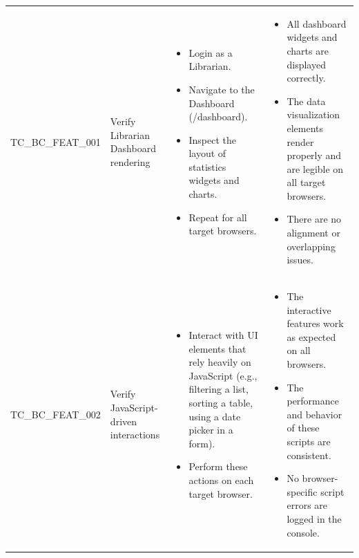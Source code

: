 \begin{longtable}{|>{\scriptsize\raggedright\arraybackslash}p{3cm}|>{\raggedright\arraybackslash}p{3.5cm}|>{\raggedright\arraybackslash}p{4cm}|>{\raggedright\arraybackslash}p{5cm}|}
\multicolumn{4}{|l|}{\textbf{Sub-Section: Feature-Specific Checks}} \\ \hline
TC\_BC\_FEAT\_001 & Verify Librarian Dashboard rendering & 
    \begin{itemize}[noitemsep, topsep=0pt, partopsep=0pt, leftmargin=*]
        \item Login as a Librarian.
        \item Navigate to the Dashboard (/dashboard).
        \item Inspect the layout of statistics widgets and charts.
        \item Repeat for all target browsers.
    \end{itemize} & 
    \begin{itemize}[noitemsep, topsep=0pt, partopsep=0pt, leftmargin=*]
        \item All dashboard widgets and charts are displayed correctly.
        \item The data visualization elements render properly and are legible on all target browsers.
        \item There are no alignment or overlapping issues.
    \end{itemize} \\ \hline
TC\_BC\_FEAT\_002 & Verify JavaScript-driven interactions & 
    \begin{itemize}[noitemsep, topsep=0pt, partopsep=0pt, leftmargin=*]
        \item Interact with UI elements that rely heavily on JavaScript (e.g., filtering a list, sorting a table, using a date picker in a form).
        \item Perform these actions on each target browser.
    \end{itemize} & 
    \begin{itemize}[noitemsep, topsep=0pt, partopsep=0pt, leftmargin=*]
        \item The interactive features work as expected on all browsers.
        \item The performance and behavior of these scripts are consistent.
        \item No browser-specific script errors are logged in the console.
    \end{itemize} \\ \hline

\end{longtable}